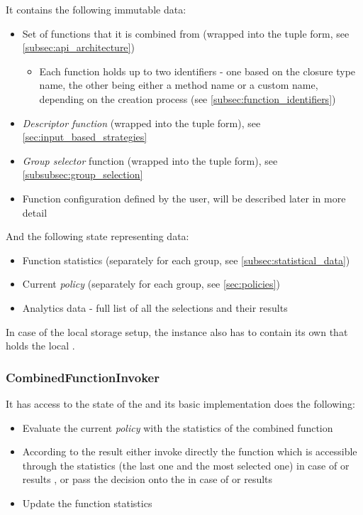 It contains the following immutable data:

\begin{itemize}
	\item Set of functions that it is combined from (wrapped into the tuple form, see \ref{subsec:api_architecture})
	\begin{itemize}
		\item	Each function holds up to two identifiers - one based on the closure type name, the other being either a method name or a custom name, depending on the creation process (see \ref{subsec:function_identifiers})
	\end{itemize}
	\item \textit{Descriptor function} (wrapped into the tuple form), see \ref{sec:input_based_strategies}
	\item \textit{Group selector} function (wrapped into the tuple form), see \ref{subsubsec:group_selection}
	\item Function configuration defined by the user, will be described later in more detail
\end{itemize}

And the following state representing data:

\begin{itemize}
	\item Function statistics (separately for each group, see \ref{subsec:statistical_data})
	\item Current \textit{policy} (separately for each group, see \ref{sec:policies})
	\item Analytics data - full list of all the selections and their results
\end{itemize}

In case of the local storage setup, the instance also has to contain its own  that holds the local .

\subsubsection{CombinedFunctionInvoker}

It has access to the state of the  and its basic implementation does the following:

\begin{itemize}
	\item Evaluate the current \textit{policy} with the statistics of the combined function
	\item According to the result either invoke directly the function which is accessible through the statistics (the last one and the most selected one) in case of  or  results , or pass the decision onto the  in case of  or  results
	\item Update the function statistics
\end{itemize}

